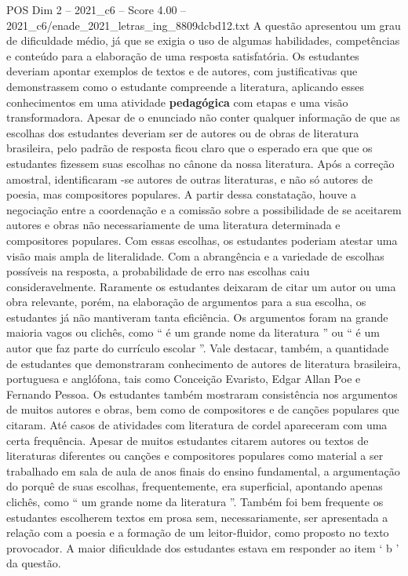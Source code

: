 \begin{textsample}{POS Dim 2 – 2021\_c6 – Score 4.00 – 2021\_c6/enade\_2021\_letras\_ing\_8809dcbd12.txt}
A questão apresentou um grau de dificuldade médio, já que se exigia o uso de algumas habilidades, competências e conteúdo para a elaboração de uma resposta satisfatória.
Os estudantes deveriam apontar exemplos de textos e de autores, com justificativas que demonstrassem como o estudante compreende a literatura, aplicando esses conhecimentos em uma atividade \textbf{pedagógica} com etapas e uma visão transformadora.
Apesar de o enunciado não conter qualquer informação de que as escolhas dos estudantes deveriam ser de autores ou de obras de literatura brasileira, pelo padrão de resposta ficou claro que o esperado era que que os estudantes fizessem suas escolhas no cânone da nossa literatura.
Após a correção amostral, identificaram -se autores de outras literaturas, e não só autores de poesia, mas compositores populares.
A partir dessa constatação, houve a negociação entre a coordenação e a comissão sobre a possibilidade de se aceitarem autores e obras não necessariamente de uma literatura determinada e compositores populares.
Com essas escolhas, os estudantes poderiam atestar uma visão mais ampla de literalidade.
Com a abrangência e a variedade de escolhas possíveis na resposta, a probabilidade de erro nas escolhas caiu consideravelmente.
Raramente os estudantes deixaram de citar um autor ou uma obra relevante, porém, na elaboração de argumentos para a sua escolha, os estudantes já não mantiveram tanta eficiência.
Os argumentos foram na grande maioria vagos ou clichês, como “ é um grande nome da literatura ” ou “ é um autor que faz parte do currículo escolar ”.
Vale destacar, também, a quantidade de estudantes que demonstraram conhecimento de autores de literatura brasileira, portuguesa e anglófona, tais como Conceição Evaristo, Edgar Allan Poe e Fernando Pessoa.
Os estudantes também mostraram consistência nos argumentos de muitos autores e obras, bem como de compositores e de canções populares que citaram.
Até casos de atividades com literatura de cordel apareceram com uma certa frequência.
Apesar de muitos estudantes citarem autores ou textos de literaturas diferentes ou canções e compositores populares como material a ser trabalhado em sala de aula de anos finais do ensino fundamental, a argumentação do porquê de suas escolhas, frequentemente, era superficial, apontando apenas clichês, como “ um grande nome da literatura ”.
Também foi bem frequente os estudantes escolherem textos em prosa sem, necessariamente, ser apresentada a relação com a poesia e a formação de um leitor-fluidor, como proposto no texto provocador.
A maior dificuldade dos estudantes estava em responder ao item ‘ b ’ da questão.

\end{textsample}
